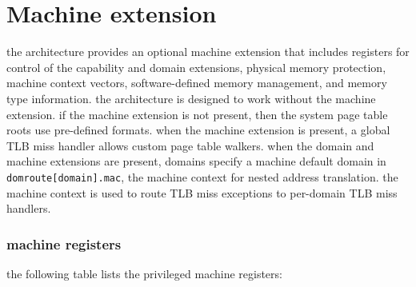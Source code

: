 \newpage
\section{Machine extension}

the architecture provides an optional machine extension that includes
registers for control of the capability and domain extensions,
physical memory protection, machine context vectors, software-defined
memory management, and memory type information.
\para
the architecture is designed to work without the machine extension.
if the machine extension is not present, then the system page table
roots use pre-defined formats. when the machine extension is present,
a global TLB miss handler allows custom page table walkers. when the
domain and machine extensions are present, domains specify a machine
default domain in \texttt{domroute[domain].mac}, the machine context for
nested address translation. the machine context is used to route TLB
miss exceptions to per-domain TLB miss handlers.

\subsubsection{machine registers}
the following table lists the privileged machine registers:

